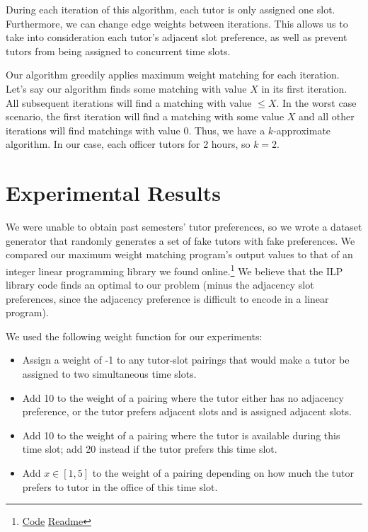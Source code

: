 \documentclass{vldb}
\begin{document}
During each iteration of this algorithm, each tutor is only assigned one slot. Furthermore, we can change edge weights between iterations. This allows us to take into consideration each tutor's adjacent slot preference, as well as prevent tutors from being assigned to concurrent time slots. 

Our algorithm greedily applies maximum weight matching for each iteration. Let's say our algorithm finds some matching with value $X$ in its first iteration. All subsequent iterations will find a matching with value $\le X$. In the worst case scenario, the first iteration will find a matching with some value $X$ and all other iterations will find matchings with value 0. Thus, we have a $k$-approximate algorithm. In our case, each officer tutors for 2 hours, so $k=2$.

\section{Experimental Results}
We were unable to obtain past semesters' tutor preferences, so we wrote a dataset generator that randomly generates a set of fake tutors with fake preferences. We compared our maximum weight matching program's output values to that of an integer linear programming library we found online.\footnote{\href{http://sourceforge.net/projects/lpsolve/files/lpsolve/5.5.2.0/}{Code} \href{http://lpsolve.sourceforge.net/5.5/Java/README.html}{Readme}} We believe that the ILP library code finds an optimal to our problem (minus the adjacency slot preferences, since the adjacency preference is difficult to encode in a linear program).

We used the following weight function for our experiments:
\begin{itemize}
\item Assign a weight of -1 to any tutor-slot pairings that would make a tutor be assigned to two simultaneous time slots.
\item Add 10 to the weight of a pairing where the tutor either has no adjacency preference, or the tutor prefers adjacent slots and is assigned adjacent slots.
\item Add 10 to the weight of a pairing where the tutor is available during this time slot; add 20 instead if the tutor prefers this time slot.
\item Add $x \in [1, 5]$ to the weight of a pairing depending on how much the tutor prefers to tutor in the office of this time slot.
\end{itemize}
\end{document}
